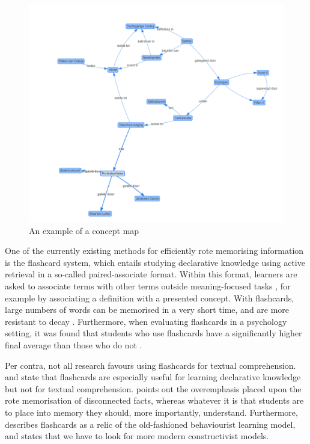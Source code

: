 \documentclass[11pt,twoside]{report} %
\begin{document}
\begin{figure}
    \centering
    \includegraphics[width=\textwidth]{img/conceptmap}
    \caption{An example of a concept map}
    \label{fig:conceptmap}
\end{figure}

One of the currently existing methods for efficiently rote memorising information is the flashcard system, which entails studying declarative knowledge using active retrieval in a so-called paired-associate format. Within this format, learners are asked to associate terms with other terms outside meaning-focused tasks \cite{nakata}, for example by associating a definition with a presented concept. With flashcards, large numbers of words can be memorised in a very short time, and are more resistant to decay \cite{nakata, joseph}. Furthermore, when evaluating flashcards in a psychology setting, it was found that students who use flashcards have a significantly higher final average than those who do not \cite{burgess, golding}.


Per contra, not all research favours using flashcards for textual comprehension.  and  state that flashcards are especially useful for learning declarative knowledge but not for textual comprehension.  points out the overemphasis placed upon the rote memorisation of disconnected facts, whereas whatever it is that students are to place into memory they should, more importantly, understand. Furthermore,  describes flashcards as a relic of the old-fashioned behaviourist learning model, and states that we have to look for more modern constructivist models.
\end{document}
